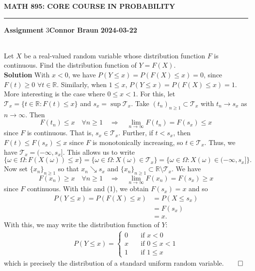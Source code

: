 \documentclass[10pt]{article}
\newcommand{\mbb}[1]{\mathbb{#1}}
\newcommand{\1}[1]{\mathbbm{1}_{#1}}
\newcommand{\mc}[1]{\mathcal{#1}}
\begin{document}
    \begin{center}
        {\bf\large{MATH 895: CORE COURSE IN PROBABILITY}}
        \smallskip
        \hrule
        \smallskip
        {\bf Assignment} 3\hfill {\bf Connor Braun} \hfill {\bf 2024-03-22}
    \end{center}
    \\[5pt]
    Let $X$ be a real-valued random variable whose distribution function $F$ is continuous. Find the distribution function of $Y=F(X)$.\\[5pt]
    {\bf Solution}\hspace{5pt} With $x<0$, we have $P(Y\leq x)=P(F(X)\leq x)=0$, since $F(t)\geq 0$ $\forall t\in\mbb{R}$. Similarly, when $1\leq x$, $P(Y\leq x)=P(F(X)\leq x)=1$.
    More interesting is the case where $0\leq x<1$. For this, let $\mc{T}_x=\{t\in\mbb{R}:F(t)\leq x\}$ and $s_x=\sup\mc{T}_x$. Take $(t_n)_{n\geq 1}\subset\mc{T}_x$ with $t_n\rightarrow s_x$ as $n\rightarrow\infty$. Then
    \[F(t_n)\leq x\quad\forall n\geq 1\quad\Rightarrow\quad\lim_{n\rightarrow\infty}F(t_n)=F(s_x)\leq x\tag{1}\]
    since $F$ is continuous. That is, $s_x\in\mc{T}_x$. Further, if $t<s_x$, then $F(t)\leq F(s_x)\leq x$ since $F$ is monotonically increasing, so $t\in\mc{T}_x$. Thus, we have
    $\mc{T}_x=(-\infty,s_x]$. This allows us to write
    \[\{\omega\in\Omega:F(X(\omega))\leq x\}=\{\omega\in\Omega:X(\omega)\in\mc{T}_x\}=\{\omega\in\Omega:X(\omega)\in(-\infty,s_x]\}.\tag{2}\]
    Now set $\{x_n\}_{n\geq 1}$ so that $x_n\searrow s_x$ and $\{x_n\}_{n\geq 1}\subset\mbb{R}\setminus\mc{T}_x$. We have
    \[F(x_n)\geq x\quad\forall n\geq 1\quad\Rightarrow\quad\lim_{n\rightarrow\infty}F(x_n)=F(s_x)\geq x\]
    since $F$ continuous. With this and (1), we obtain $F(s_x)=x$ and so
    \begin{align*}
        P(Y\leq x)=P(F(X)\leq x)&=P(X\leq s_x)\tag{by (2)}\\
        &=F(s_x)\\
        &=x.
    \end{align*}
    With this, we may write the distribution function of $Y$: 
    \begin{align*}
        P(Y\leq x)=\begin{cases}
            0\quad&\text{if $x<0$}\\
            x\quad&\text{if $0\leq x<1$}\\
            1\quad&\text{if $1\leq x$}
        \end{cases}
    \end{align*}
    which is precisely the distribution of a standard uniform random variable.\hfill{$\qed$}\\[5pt]
\end{document}
